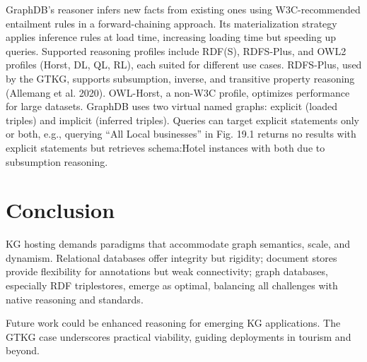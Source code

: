 \documentclass[12pt]{article}
\begin{document}
GraphDB’s reasoner infers new facts from existing ones using W3C-recommended entailment rules in a forward-chaining approach. Its materialization strategy applies inference rules at load time, increasing loading time but speeding up queries. Supported reasoning profiles include RDF(S), RDFS-Plus, and OWL2 profiles (Horst, DL, QL, RL), each suited for different use cases. RDFS-Plus, used by the GTKG, supports subsumption, inverse, and transitive property reasoning (Allemang et al. 2020). OWL-Horst, a non-W3C profile, optimizes performance for large datasets. GraphDB uses two virtual named graphs: explicit (loaded triples) and implicit (inferred triples). Queries can target explicit statements only or both, e.g., querying “All Local businesses” in Fig. 19.1 returns no results with explicit statements but retrieves schema:Hotel instances with both due to subsumption reasoning.
\section{Conclusion}
KG hosting demands paradigms that accommodate graph semantics, scale, and dynamism. Relational databases offer integrity but rigidity; document stores provide flexibility for annotations but weak connectivity; graph databases, especially RDF triplestores, emerge as optimal, balancing all challenges with native reasoning and standards. 

Future work could be enhanced reasoning for emerging KG applications. The GTKG case underscores practical viability, guiding deployments in tourism and beyond.
\end{document}
